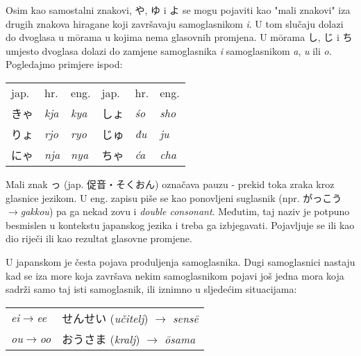 	\newpage
	
	Osim kao samostalni znakovi, や, ゆ i よ se mogu pojaviti kao "mali znakovi" iza drugih znakova hiragane koji završavaju samoglasnikom \textit{i}. U tom slučaju dolazi do dvoglasa\footnotemark[3] u m\={o}rama u kojima nema glasovnih promjena. U m\={o}rama し, じ i ち umjesto dvoglasa dolazi do zamjene samoglasnika \textit{i} samoglasnikom \textit{a}, \textit{u} ili \textit{o}. Pogledajmo primjere ispod:
	
	\begin{tabular}{l l l | l l l}
		jap.&hr.&eng.&jap.&hr.&eng.\\
		きゃ&\textit{kja}&\textit{kya}&しょ&\textit{\'{s}o}&\textit{sho}\\
		りょ&\textit{rjo}&\textit{ryo}&じゅ&\textit{đu}&\textit{ju}\\
		にゃ&\textit{nja}&\textit{nya}&ちゃ&\textit{ća}&\textit{cha}\\
	\end{tabular}

	
	Mali znak っ (jap. 促音・そくおん) označava pauzu - prekid toka zraka kroz glasnice jezikom. U eng. zapisu piše se kao ponovljeni suglasnik (npr. がっこう$\rightarrow$\textit{gakkou}) pa ga nekad zovu i \textit{double consonant}. Međutim, taj naziv je potpuno besmislen u kontekstu japanskog jezika i treba ga izbjegavati. Pojavljuje se ili kao dio riječi ili kao rezultat glasovne promjene.
	
	
	U japanskom je česta pojava produljenja samoglasnika. Dugi samoglasnici nastaju kad se iza more koja završava nekim samoglasnikom pojavi još jedna mora koja sadrži samo taj isti samoglasnik, ili iznimno u sljedećim situacijama:
	
	\vspace{5pt}
	\begin{tabular}{l l}
		\textit{ei}$\rightarrow$\textit{ee} & せんせい (\textit{učitelj}) $\rightarrow$ \textit{sens\={e}}\\
		\textit{ou}$\rightarrow$\textit{oo} & おうさま (\textit{kralj}) $\rightarrow$ \textit{\={o}sama}\\
	\end{tabular}

